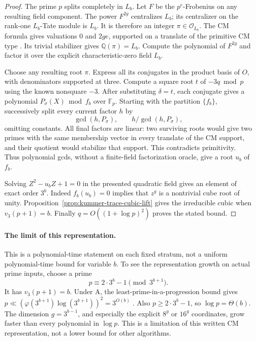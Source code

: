 \documentclass[11pt]{article}
\theoremstyle{definition}
\theoremstyle{remark}
\begin{document}
\begin{proof}
The prime \(p\) splits completely in \(L_b\). Let \(F\)
be the \(p^e\)-Frobenius on any resulting field component.
The power \(F^{2g}\) centralizes \(L_b\); its centralizer
on the rank-one \(L_b\)-Tate module is \(L_b\). It is
therefore an integer \(\pi\in\mathcal O_{L_b}\). The CM
formula gives valuations \(0\) and \(2ge\), supported on
a translate of the primitive CM type
\citep[Theorem~8.1 and Corollaries~8.2--8.3, pp.~66--68]{MilneCM2020}.
Its trivial stabilizer gives \(\mathbb Q(\pi)=L_b\).
Compute the polynomial of \(F^{2g}\) and factor it over the
explicit characteristic-zero field \(L_b\).

Choose any resulting root \(\pi\). Express all its conjugates
in the product basis of \(O\), with denominators supported
at three. Compute a square root \(t\) of \(-3q\bmod p\)
using the known nonsquare \(-3\). After substituting
\(\delta=t\), each conjugate gives a polynomial
\(P_\sigma(X)\bmod f_b\) over \(\mathbb F_p\).
Starting with the partition \(\{f_b\}\), successively split
every current factor \(h\) by
\[
 \gcd(h,P_\sigma),\qquad h/\gcd(h,P_\sigma),
\]
omitting constants. All final factors are linear: two surviving
roots would give two primes with the same membership vector
in every translate of the CM support, and their quotient would
stabilize that support. This contradicts primitivity. Thus
polynomial gcds, without a finite-field factorization oracle,
give a root \(u_b\) of \(f_b\).

Solving \(Z^2-u_bZ+1=0\) in the presented quadratic field
gives an element of exact order \(3^b\). Indeed
\(f_b(u_b)=0\) implies that \(z^g\) is a nontrivial cube
root of unity. Proposition~\ref{prop:kummer-trace-cubic-lift}
gives the irreducible cubic when \(v_3(p+1)=b\). Finally
\(q=O((1+\log p)^2)\) proves the stated bound.
\end{proof}

\paragraph{The limit of this representation.}
This is a polynomial-time statement on each fixed stratum,
not a uniform polynomial-time bound for variable \(b\).
To see the representation growth on actual prime inputs,
choose a prime
\[
 p\equiv 2\cdot3^b-1\pmod{3^{b+1}}.
\]
It has \(v_3(p+1)=b\). Under \(\mathrm A\), the
least-prime-in-a-progression bound gives
\(p\ll (\varphi(3^{b+1})\log(3^{b+1}))^2=3^{O(b)}\)
\citep[Corollary~1.2]{LLS2015}. Also \(p\ge2\cdot3^b-1\),
so \(\log p=\Theta(b)\). The dimension
\(g=3^{b-1}\), and especially the explicit \(8^g\) or
\(16^g\) coordinates, grow faster than every polynomial
in \(\log p\). This is a limitation of this written CM
representation, not a lower bound for other algorithms.
\end{document}
